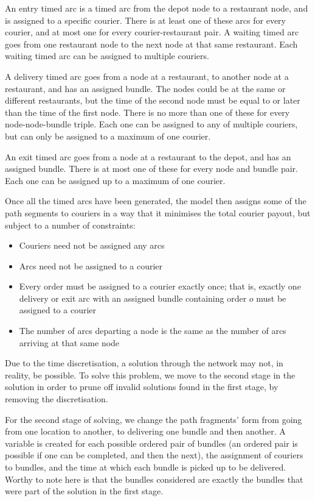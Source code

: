 \documentclass{article}
\begin{document}
An entry timed arc is a timed arc from the depot node to a restaurant node, and is assigned to a specific courier. There is at least one of these arcs for every courier, and at most one for every courier-restaurant pair. A waiting timed arc goes from one restaurant node to the next node at that same restaurant. Each waiting timed arc can be assigned to multiple couriers.

A delivery timed arc goes from a node at a restaurant, to another node at a restaurant, and has an assigned bundle. The nodes could be at the same or different restaurants, but the time of the second node must be equal to or later than the time of the first node. There is no more than one of these for every node-node-bundle triple. Each one can be assigned to any of multiple couriers, but can only be assigned to a maximum of one courier.

An exit timed arc goes from a node at a restaurant to the depot, and has an assigned bundle. There is at most one of these for every node and bundle pair. Each one can be assigned up to a maximum of one courier.

Once all the timed arcs have been generated, the model then assigns some of the path segments to couriers in a way that it minimises the total courier payout, but subject to a number of constraints:

\begin{itemize}
\item Couriers need not be assigned any arcs
\item Arcs need not be assigned to a courier
\item Every order must be assigned to a courier exactly once; that is, exactly one delivery or exit arc with an assigned bundle containing order $o$ must be assigned to a courier
\item The number of arcs departing a node is the same as the number of arcs arriving at that same node
\end{itemize}

Due to the time discretisation, a solution through the network may not, in reality, be possible. To solve this problem, we move to the second stage in the solution in order to prune off invalid solutions found in the first stage, by removing the discretisation.

For the second stage of solving, we change the path fragments' form from going from one location to another, to delivering one bundle and then another. A variable is created for each possible ordered pair of bundles (an ordered pair is possible if one can be completed, and then the next), the assignment of couriers to bundles, and the time at which each bundle is picked up to be delivered. Worthy to note here is that the bundles considered are exactly the bundles that were part of the solution in the first stage.
\end{document}
